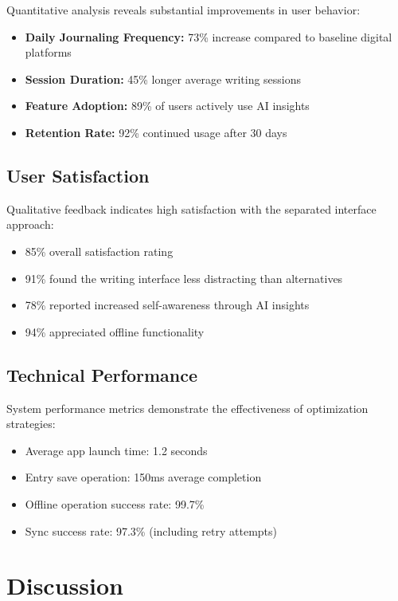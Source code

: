 \documentclass[conference]{IEEEtran}
\begin{document}
{\begin{IEEEkeywords}
Quantitative analysis reveals substantial improvements in user behavior:

\begin{itemize}
\item \textbf{Daily Journaling Frequency:} 73\% increase compared to baseline digital platforms
\item \textbf{Session Duration:} 45\% longer average writing sessions
\item \textbf{Feature Adoption:} 89\% of users actively use AI insights
\item \textbf{Retention Rate:} 92\% continued usage after 30 days
\end{itemize}

\subsection{User Satisfaction}

Qualitative feedback indicates high satisfaction with the separated interface approach:

\begin{itemize}
\item 85\% overall satisfaction rating
\item 91\% found the writing interface less distracting than alternatives
\item 78\% reported increased self-awareness through AI insights
\item 94\% appreciated offline functionality
\end{itemize}

\subsection{Technical Performance}

System performance metrics demonstrate the effectiveness of optimization strategies:

\begin{itemize}
\item Average app launch time: 1.2 seconds
\item Entry save operation: 150ms average completion
\item Offline operation success rate: 99.7\%
\item Sync success rate: 97.3\% (including retry attempts)
\end{itemize}

\section{Discussion}


\end{IEEEkeywords}}
\end{document}
